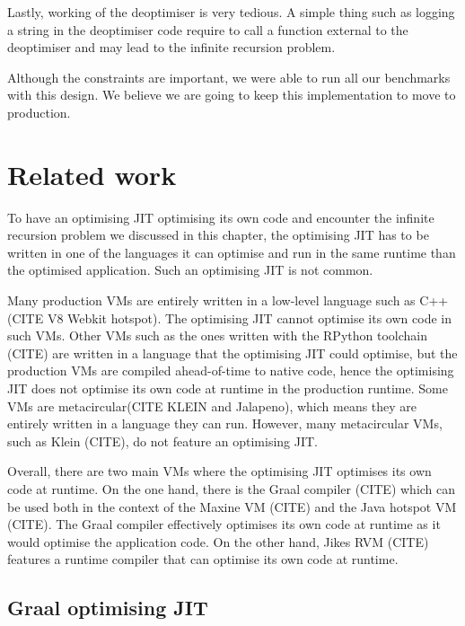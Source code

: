 \documentclass[a4paper,12pt,twoside]{../includes/ThesisStyle}
\begin{document}
Lastly, working of the deoptimiser is very tedious. A simple thing such as logging a string in the deoptimiser code require to call a function external to the deoptimiser and may lead to the infinite recursion problem.

Although the constraints are important, we were able to run all our benchmarks with this design. We believe we are going to keep this implementation to move to production.


\section{Related work}

To have an optimising JIT optimising its own code and encounter the infinite recursion problem we discussed in this chapter, the optimising JIT has to be written in one of the languages it can optimise and run in the same runtime than the optimised application. Such an optimising JIT is not common.

Many production VMs are entirely written in a low-level language such as C++ (CITE V8 Webkit hotspot). The optimising JIT cannot optimise its own code in such VMs. Other VMs such as the ones written with the RPython toolchain (CITE) are written in a language that the optimising JIT could optimise, but the production VMs are compiled ahead-of-time to native code, hence the optimising JIT does not optimise its own code at runtime in the production runtime. Some VMs are metacircular(CITE KLEIN and Jalapeno), which means they are entirely written in a language they can run. However, many metacircular VMs, such as Klein (CITE), do not feature an optimising JIT. 

Overall, there are two main VMs where the optimising JIT optimises its own code at runtime. On the one hand, there is the Graal compiler (CITE) which can be used both in the context of the Maxine VM (CITE) and the Java hotspot VM (CITE). The Graal compiler effectively optimises its own code at runtime as it would optimise the application code. On the other hand, Jikes RVM (CITE) features a runtime compiler that can optimise its own code at runtime. 

\subsection{Graal optimising JIT}
\end{document}
